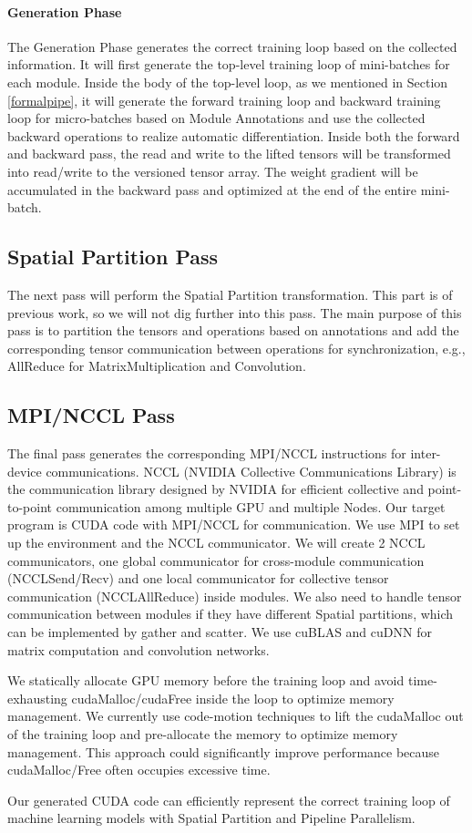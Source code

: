 \documentclass[sigplan, nonacm]{acmart}\settopmatter{printfolios=true,printccs=false,printacmref=false}
\begin{document}
\paragraph{Generation Phase}
The Generation Phase generates the correct training loop based on the collected information. It will first generate the top-level training loop of mini-batches for each module. Inside the body of the top-level loop, as we mentioned in Section \ref{formalpipe}, it will generate the forward training loop and backward training loop for micro-batches based on Module Annotations and use the collected backward operations to realize automatic differentiation. Inside both the forward and backward pass, the read and write to the lifted tensors will be transformed into read/write to the versioned tensor array. The weight gradient will be accumulated in the backward pass and optimized at the end of the entire mini-batch.\par
\subsection{Spatial Partition Pass}
The next pass will perform the Spatial Partition transformation. This part is of previous work, so we will not dig further into this pass. The main purpose of this pass is to partition the tensors and operations based on annotations and add the corresponding tensor communication between operations for synchronization, e.g., AllReduce for MatrixMultiplication and Convolution.\par
\subsection{MPI/NCCL Pass}
The final pass generates the corresponding MPI/NCCL instructions for inter-device communications. NCCL (NVIDIA Collective Communications Library) is the communication library designed by NVIDIA for efficient collective and point-to-point communication among multiple GPU and multiple Nodes. Our target program is CUDA code with MPI/NCCL for communication. We use MPI to set up the environment and the NCCL communicator. We will create 2 NCCL communicators, one global communicator for cross-module communication (NCCLSend/Recv) and one local communicator for collective tensor communication (NCCLAllReduce) inside modules. We also need to handle tensor communication between modules if they have different Spatial partitions, which can be implemented by gather and scatter. We use cuBLAS and cuDNN for matrix computation and convolution networks.\par
We statically allocate GPU memory before the training loop and avoid time-exhausting cudaMalloc/cudaFree inside the loop to optimize memory management. We currently use code-motion techniques to lift the cudaMalloc out of the training loop and pre-allocate the memory to optimize memory management. This approach could significantly improve performance because cudaMalloc/Free often occupies excessive time.\par
Our generated CUDA code can efficiently represent the correct training loop of machine learning models with Spatial Partition and Pipeline Parallelism.
\end{document}
